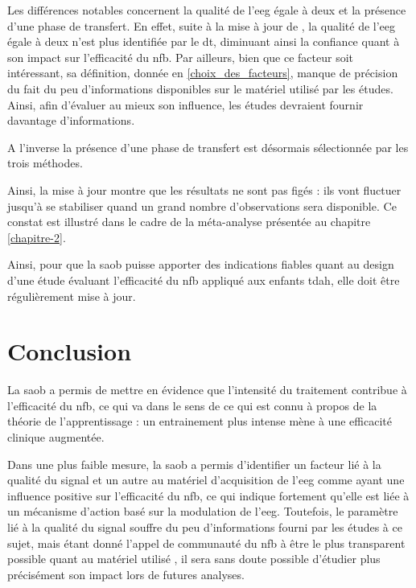 Les différences notables concernent la qualité de l'\gls{eeg} égale à deux et la présence d'une phase de transfert. En effet, suite à la mise à jour de \citet{Bussalb2019clinical}, 
la qualité de l'\gls{eeg} égale à deux 
n'est plus identifiée par le \gls{dt}, diminuant ainsi la confiance quant à son impact sur l'efficacité du \gls{nfb}. Par ailleurs, bien que ce facteur soit intéressant, sa définition, 
donnée en \ref{choix_des_facteurs}, manque de précision 
du fait du peu d'informations disponibles sur le matériel utilisé par les études. Ainsi, afin d'évaluer au mieux son influence, les études devraient fournir 
davantage d'informations.

A l'inverse la présence d'une phase de transfert est désormais sélectionnée par les trois méthodes.


Ainsi, la mise à jour montre que les résultats ne sont pas figés : ils vont fluctuer jusqu'à se stabiliser quand un grand nombre d'observations sera disponible. Ce constat est illustré dans 
le cadre de la méta-analyse présentée au chapitre \ref{chapitre-2}.

Ainsi, pour que la \gls{saob} puisse apporter des indications fiables quant au design d'une étude évaluant l'efficacité du \gls{nfb} appliqué aux enfants \gls{tdah}, elle doit être 
régulièrement mise à jour. 

\section{Conclusion}

La \gls{saob} a permis de mettre en évidence que l'intensité du traitement contribue à l'efficacité du \gls{nfb}, ce qui va dans le sens de ce qui est connu à propos de 
la théorie de l'apprentissage \citep{Mowrer1960} : un entrainement plus intense mène à une efficacité clinique augmentée. 

Dans une plus faible mesure, la \gls{saob} a permis d'identifier un facteur lié à la qualité du signal et un autre au matériel d'acquisition de l'\gls{eeg} comme ayant une influence positive 
sur l'efficacité du \gls{nfb}, ce qui indique fortement qu'elle est liée à un mécanisme d'action basé sur la modulation de l'\gls{eeg}. Toutefois, le paramètre lié à la qualité du signal 
souffre du peu d'informations fourni par les études à ce sujet, mais étant donné l'appel de
communauté du \gls{nfb} à être le plus transparent possible quant au matériel utilisé \citep{Ros2019}, il sera sans doute possible d'étudier plus précisément
son impact lors de futures analyses.


